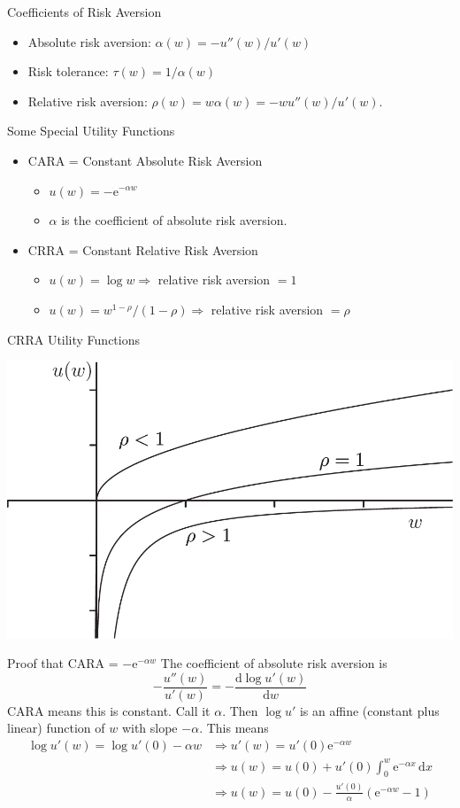 \documentclass[10pt]{beamer}
\newcommand{\bi}{\begin{itemize}}
\newcommand{\ei}{\end{itemize}}
\newcommand{\im}{\item}
\newcommand{\D}{\mathrm{d}}
\newcommand{\E}{\mathrm{e}}
\begin{document}
\begin{frame}{Coefficients of Risk Aversion}
\bi    
\im Absolute risk aversion: $\alpha(w) = -u''(w)/u'(w)$
\im Risk tolerance: $\tau(w) =  1/\alpha(w)$
\im Relative risk aversion: $\rho(w) = w\alpha(w) = - wu''(w)/u'(w)$.
\ei
\end{frame}


\begin{frame}{Some Special Utility Functions}
\bi
    
\im CARA = Constant Absolute Risk Aversion
\bi 
\im $u(w) = - \E^{-\alpha w}$
\im $\alpha$ is the coefficient of absolute risk aversion.
\ei 

\im CRRA = Constant Relative Risk Aversion 
\bi
\im 
$u(w) = \log w \Rightarrow$ relative risk aversion $ = 1$
\im $u(w) = w^{1-\rho}/ (1-\rho) \Rightarrow$ relative risk aversion $=\rho$
\ei

\ei
\end{frame}

\begin{frame}{CRRA Utility Functions}
  \begin{center}
  \includegraphics{images/fig1_4.png}
  \end{center}
  \end{frame}

\begin{frame}{Proof that CARA = $-\E^{-\alpha w}$}
 The coefficient of absolute risk aversion is
 $$-\frac{u''(w)}{u'(w)} = - \frac{\D \log u'(w)}{\D w}$$
 CARA means this is constant.  Call it $\alpha$. Then $\log u'$
 is an affine (constant plus linear) function of $w$ with slope $-\alpha$.  This means
\begin{align*}
    \log u'(w) = \log u'(0) - \alpha w &\Rightarrow u'(w) = u'(0)\E^{-\alpha w}\\
& \Rightarrow u(w) = u(0) + u'(0)\int_0^w \E^{-\alpha x}\,\D x\\
& \Rightarrow u(w) = u(0) - \frac{u'(0)}{\alpha} \left(\E^{-\alpha w} - 1\right)
\end{align*}
\end{frame}
\end{document}
